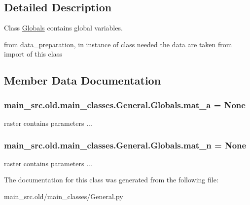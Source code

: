 \subsection{Detailed Description}
Class \hyperlink{classmain__src_8old_1_1main__classes_1_1General_1_1Globals}{Globals} contains global variables. 

from data\-\_\-preparation, in instance of class needed the data are taken from import of this class 

\subsection{Member Data Documentation}
\hypertarget{classmain__src_8old_1_1main__classes_1_1General_1_1Globals_a0a72f07efc49b4c927defed203ac2948}{
\subsubsection[{mat\-\_\-a}]{\setlength{\rightskip}{0pt plus 5cm}main\-\_\-src.\-old.\-main\-\_\-classes.\-General.\-Globals.\-mat\-\_\-a = None\hspace{0.3cm}{\ttfamily [static]}}}\label{classmain__src_8old_1_1main__classes_1_1General_1_1Globals_a0a72f07efc49b4c927defed203ac2948}


raster contains parameters ... 

\hypertarget{classmain__src_8old_1_1main__classes_1_1General_1_1Globals_a04fbb3e5de7843ccfe5baa7f06fffea8}{
\subsubsection[{mat\-\_\-n}]{\setlength{\rightskip}{0pt plus 5cm}main\-\_\-src.\-old.\-main\-\_\-classes.\-General.\-Globals.\-mat\-\_\-n = None\hspace{0.3cm}{\ttfamily [static]}}}\label{classmain__src_8old_1_1main__classes_1_1General_1_1Globals_a04fbb3e5de7843ccfe5baa7f06fffea8}


raster contains parameters ... 



The documentation for this class was generated from the following file\-:\begin{DoxyCompactItemize}
\item 
main\-\_\-src.\-old/main\-\_\-classes/General.\-py\end{DoxyCompactItemize}
